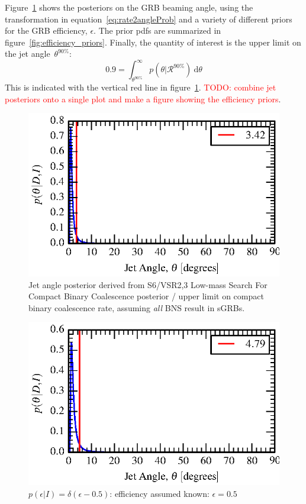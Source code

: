 \documentclass[twocolumn,nofootinbib]{revtex4-1}
\newcommand{\cbcrate}{{{\mathcal R}}}
\newcommand{\diff}{{\mathrm d}}
\begin{document}
Figure~\ref{fig:jetPosterior} shows the posteriors on the GRB
beaming angle, using the transformation in equation~\ref{eq:rate2angleProb} and
a variety of different priors for the GRB efficiency, $\epsilon$.  The prior
pdfs are summarized in figure~\ref{fig:efficiency_priors}.
%
Finally, the quantity of interest is the upper limit on the jet
angle~$\theta^{90\%}$:
%
\begin{equation}
0.9 = \int_{\theta^{90\%}}^{\infty}p(\theta | \cbcrate^{90\%})~\diff \theta
\end{equation}
%
This is indicated with the vertical red line in figure~\ref{fig:jetPosterior}.
\textcolor{red}{TODO: combine jet posteriors onto a single plot and make a
figure showing the efficiency priors}.

\begin{figure}
\includegraphics{iLIGO/jet_angle_posterior_s6UL_TEST_deltaEffPrior-1.0.eps}
\caption{Jet angle posterior derived from S6/VSR2,3 Low-mass Search For Compact Binary
Coalescence posterior / upper limit on compact binary coalescence
rate, assuming \emph{all} BNS result in sGRBs.\label{fig:jetPosterior}}
\end{figure}

\begin{figure}[h!]
\includegraphics{iLIGO/jet_angle_posterior_s6UL_TEST_deltaEffPrior-0.5.eps}
\caption{$p(\epsilon|I)=\delta(\epsilon-0.5)$: efficiency assumed known:
$\epsilon=0.5$}
\end{figure}
\end{document}
